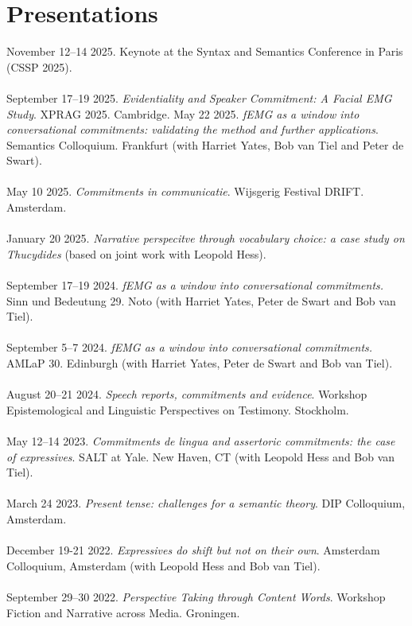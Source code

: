 \documentclass[a4paper,11pt]{article}
\begin{document}
\section*{Presentations}

November 12--14 2025. Keynote at the Syntax and Semantics Conference in Paris (CSSP 2025).\\\\
September 17--19 2025.  \emph{Evidentiality and Speaker Commitment: A Facial EMG Study}.  XPRAG 2025. Cambridge.
May 22 2025. \emph{fEMG as a window into conversational commitments: validating the method and further applications}. Semantics Colloquium. Frankfurt (with Harriet Yates, Bob van Tiel and Peter de Swart).\\\\
May 10 2025. \emph{Commitments in communicatie}. Wijsgerig Festival DRIFT. Amsterdam.\\\\ 
January 20 2025. \emph{Narrative perspecitve through vocabulary choice: a case study on Thucydides} (based on joint work with Leopold Hess).\\\\
September 17--19 2024. \emph{fEMG as a window into conversational commitments.} Sinn und Bedeutung 29. Noto (with Harriet Yates, Peter de Swart and Bob van Tiel).\\\\
September 5--7 2024. \emph{fEMG as a window into conversational commitments.} AMLaP 30. Edinburgh (with Harriet Yates, Peter de Swart and Bob van Tiel).\\\\
August 20--21 2024. \emph{Speech reports, commitments and evidence}. Workshop Epistemological and Linguistic Perspectives on Testimony. Stockholm.\\\\
May 12--14 2023. \emph{Commitments de lingua and assertoric commitments: the case of expressives}. SALT at Yale. New Haven, CT (with Leopold Hess and Bob van Tiel).\\\\
March 24 2023. \emph{Present tense: challenges for a semantic theory}. DIP Colloquium, Amsterdam.\\\\
December 19-21 2022. \emph{Expressives do shift but not on their own}. Amsterdam Colloquium, Amsterdam (with Leopold Hess and Bob van Tiel).\\\\ 
September 29--30 2022. \emph{Perspective Taking through Content Words}. Workshop Fiction and Narrative across Media. Groningen.\\\\
\end{document}
